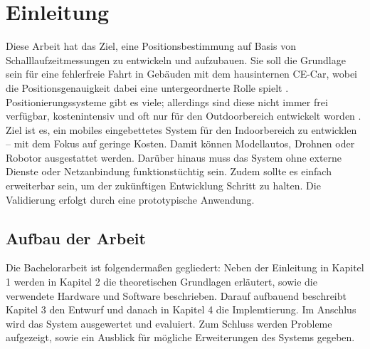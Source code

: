 \newpage
\section{Einleitung}

Diese Arbeit hat das Ziel, eine Positionsbestimmung auf Basis von Schalllaufzeitmessungen zu entwickeln und aufzubauen. Sie soll die Grundlage sein für eine fehlerfreie Fahrt in Gebäuden mit dem hausinternen CE-Car, wobei die Positionsgenauigkeit dabei eine untergeordnerte Rolle spielt \cite{src_CE_CAR}. Positionierungssysteme gibt es viele; allerdings sind diese nicht immer frei verfügbar, kostenintensiv und oft nur für den Outdoorbereich entwickelt worden \cite{src_INDOOR_OUTDOOR}. Ziel ist es, ein mobiles eingebettetes System für den Indoorbereich zu entwicklen -- mit dem Fokus auf geringe Kosten. Damit können Modellautos, Drohnen oder Robotor ausgestattet werden. Darüber hinaus muss das System ohne externe Dienste oder Netzanbindung funktionstüchtig sein. Zudem sollte es einfach erweiterbar sein, um der zukünftigen Entwicklung Schritt zu halten. Die Validierung erfolgt durch eine prototypische Anwendung.

\subsection{Aufbau der Arbeit}
Die Bachelorarbeit ist folgendermaßen gegliedert: Neben der Einleitung in Kapitel 1 werden in Kapitel 2 die theoretischen Grundlagen erläutert, sowie die verwendete Hardware und Software beschrieben. Darauf aufbauend beschreibt Kapitel 3 den Entwurf und danach in Kapitel 4 die Implemtierung. Im Anschlus wird das System ausgewertet und evaluiert. Zum Schluss werden Probleme aufgezeigt, sowie ein Ausblick für mögliche Erweiterungen des Systems gegeben.
